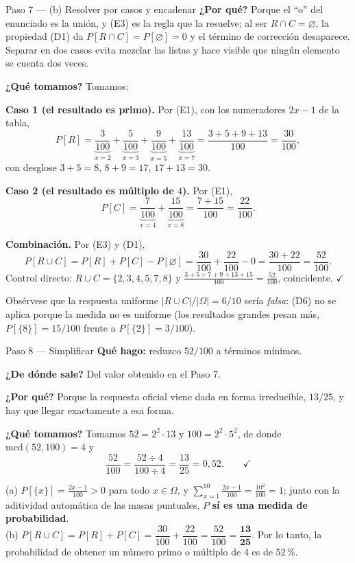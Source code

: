 \documentclass[11pt]{article}
\begin{document}
\begin{sol}
\begin{paso}{Paso 7 --- (b) Resolver por casos y encadenar}
\textbf{¿Por qué?} Porque el ``o'' del enunciado es la unión, y (E3) es la regla que la
resuelve; al ser $R\cap C=\varnothing$, la propiedad (D1) da $P[R\cap C]=P[\varnothing]=0$ y el
término de corrección desaparece. Separar en dos casos evita mezclar las listas y hace visible
que ningún elemento se cuenta dos veces.

\textbf{¿Qué tomamos?} Tomamos:

\medskip
\textbf{Caso 1 (el resultado es primo).} Por (E1), con los numeradores $2x-1$ de la tabla,
\[
P[R]=\underbrace{\frac{3}{100}}_{x=2}+\underbrace{\frac{5}{100}}_{x=3}
+\underbrace{\frac{9}{100}}_{x=5}+\underbrace{\frac{13}{100}}_{x=7}
=\frac{3+5+9+13}{100}=\frac{30}{100},
\]
con desglose $3+5=8$, $8+9=17$, $17+13=30$.

\medskip
\textbf{Caso 2 (el resultado es múltiplo de $4$).} Por (E1),
\[
P[C]=\underbrace{\frac{7}{100}}_{x=4}+\underbrace{\frac{15}{100}}_{x=8}
=\frac{7+15}{100}=\frac{22}{100}.
\]

\medskip
\textbf{Combinación.} Por (E3) y (D1),
\[
P[R\cup C]=P[R]+P[C]-P[\varnothing]=\frac{30}{100}+\frac{22}{100}-0=\frac{30+22}{100}
=\frac{52}{100}.
\]
Control directo: $R\cup C=\{2,3,4,5,7,8\}$ y
$\frac{3+5+7+9+13+15}{100}=\frac{52}{100}$, coincidente. $\checkmark$

Obsérvese que la respuesta uniforme $|R\cup C|/|\Omega|=6/10$ sería \emph{falsa}: (D6) no se
aplica porque la medida no es uniforme (los resultados grandes pesan más,
$P[\{8\}]=15/100$ frente a $P[\{2\}]=3/100$).
\end{paso}

\begin{paso}{Paso 8 --- Simplificar}
\textbf{Qué hago:} reduzco $52/100$ a términos mínimos.

\textbf{¿De dónde sale?} Del valor obtenido en el Paso 7.

\textbf{¿Por qué?} Porque la respuesta oficial viene dada en forma irreducible, $13/25$, y hay
que llegar exactamente a esa forma.

\textbf{¿Qué tomamos?} Tomamos $52=2^{2}\cdot 13$ y $100=2^{2}\cdot 5^{2}$, de donde
$\mathrm{mcd}(52,100)=4$ y
\[
\frac{52}{100}=\frac{52\div 4}{100\div 4}=\frac{13}{25}=0{,}52 . \qquad\checkmark
\]
\end{paso}

\end{sol}

\begin{resp}
(a) $P[\{x\}]=\frac{2x-1}{100}>0$ para todo $x\in\Omega$, y
$\sum_{x=1}^{10}\frac{2x-1}{100}=\frac{10^{2}}{100}=1$; junto con la aditividad automática de
las masas puntuales, $P$ \textbf{sí es una medida de probabilidad}.\\[4pt]
(b) $P[R\cup C]=P[R]+P[C]=\dfrac{30}{100}+\dfrac{22}{100}=\dfrac{52}{100}=\mathbf{\dfrac{13}{25}}$.
Por lo tanto, la probabilidad de obtener un número primo o múltiplo de $4$ es de $52$\,\%.
\end{resp}
\end{document}
